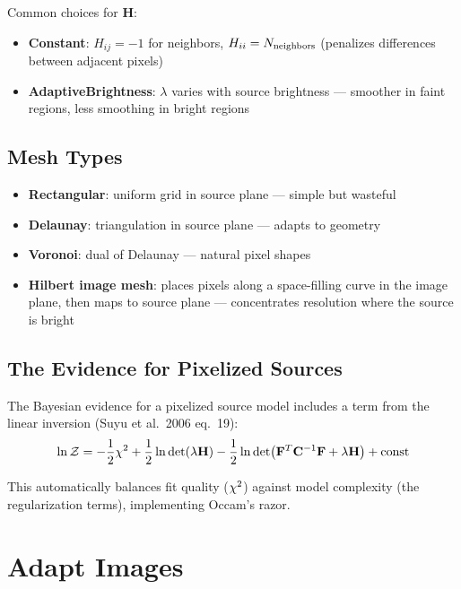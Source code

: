 \documentclass[11pt, letterpaper]{article}
\begin{document}
Common choices for $\mathbf{H}$:
\begin{itemize}[nosep]
  \item \textbf{Constant}: $H_{ij} = -1$ for neighbors, $H_{ii} = N_{\rm neighbors}$
    (penalizes differences between adjacent pixels)
  \item \textbf{AdaptiveBrightness}: $\lambda$ varies with source brightness —
    smoother in faint regions, less smoothing in bright regions
\end{itemize}

\subsection{Mesh Types}

\begin{itemize}[nosep]
  \item \textbf{Rectangular}: uniform grid in source plane — simple but wasteful
  \item \textbf{Delaunay}: triangulation in source plane — adapts to geometry
  \item \textbf{Voronoi}: dual of Delaunay — natural pixel shapes
  \item \textbf{Hilbert image mesh}: places pixels along a space-filling curve
    in the image plane, then maps to source plane — concentrates resolution
    where the source is bright
\end{itemize}

\subsection{The Evidence for Pixelized Sources}

The Bayesian evidence for a pixelized source model includes a term
from the linear inversion (Suyu et al.\ 2006 eq.~19):
\begin{equation}
\ln \mathcal{Z} = -\frac{1}{2}\chi^2 + \frac{1}{2}\ln\det(\lambda\mathbf{H})
- \frac{1}{2}\ln\det\bigl(\mathbf{F}^T\mathbf{C}^{-1}\mathbf{F} + \lambda\mathbf{H}\bigr)
+ \text{const}
\label{eq:pix-evidence}
\end{equation}

This automatically balances fit quality ($\chi^2$) against model
complexity (the regularization terms), implementing Occam's razor.

\section{Adapt Images}
\label{sec:adapt}
\end{document}
